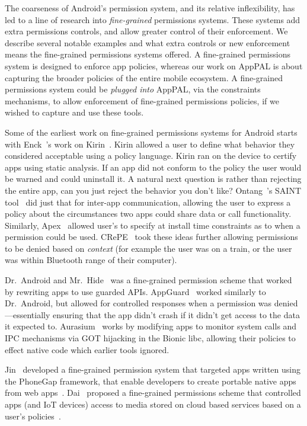 \documentclass[thesis.tex]{subfiles}
\begin{document}
The coarseness of Android's permission system, and its relative
inflexibility, has led to a line of research into \emph{fine-grained}
permissions systems.  These systems add extra permissions controls,
and allow greater control of their enforcement. We describe several
notable examples and what extra controls or new enforcement means the
fine-grained permissions systems offered.  A fine-grained permissions
system is designed to enforce app policies, whereas our work on AppPAL
is about capturing the broader policies of the entire mobile
ecosystem.  A fine-grained permissions system could be \emph{plugged
into} AppPAL, via the constraints mechanisms, to allow enforcement of
fine-grained permissions policies, if we wished to capture and use
these tools.

Some of the earliest work on fine-grained permissions systems for
Android starts with Enck~\etal's work on
Kirin~\cite{enck_lightweight_2009}.  Kirin allowed a user to define
what behavior they considered acceptable using a policy language.
Kirin ran on the device to certify apps using static analysis.  If an
app did not conform to the policy the user would be warned and could
uninstall it.  A natural next question is rather than rejecting the
entire app, can you just reject the behavior you don't like?
Ontang~\etal's SAINT tool~\cite{ongtang_semantically_2012} did just
that for inter-app communication, allowing the user to express a
policy about the circumstances two apps could share data or call
functionality.  Similarly, Apex~\cite{nauman_apex:_2010} allowed
user's to specify at install time constraints as to when a permission
could be used.  CRePE~\cite{conti_crepe:_2010} took these ideas
further allowing permissions to be denied based on \emph{context} (for
example the user was on a train, or the user was within Bluetooth
range of their computer).

Dr{.}~Android and Mr{.}~Hide~\cite{jeon_dr._2012} was a fine-grained
permission scheme that worked by rewriting apps to use guarded APIs.
AppGuard~\cite{backes_appguard_2013} worked similarly to
Dr{.}~Android, but allowed for controlled responses when a permission
was denied---essentially ensuring that the app didn't crash if it
didn't get access to the data it expected
to. Aurasium~\cite{xu_aurasium:_2012} works by modifying apps to
monitor system calls and IPC mechanisms via GOT hijacking in the
Bionic libc, allowing their policies to effect native code which
earlier tools ignored.

Jin~\etal{} developed a fine-grained permission system that targeted
apps written using the PhoneGap framework, that enable developers to
create portable native apps from web
apps~\cite{jin_fine-grained_2015}. Dai~\etal{} proposed a fine-grained
permissions scheme that controlled apps (and IoT devices) access to
media stored on cloud based services based on a user's
policies~\cite{dai_who_2017}.
\end{document}
